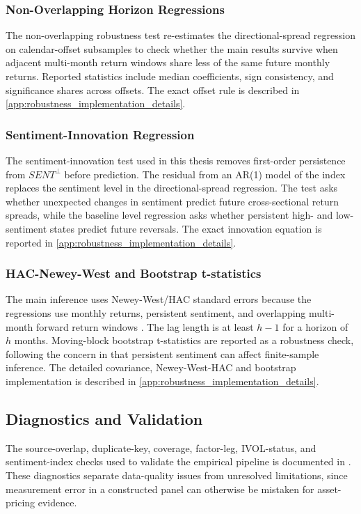 \documentclass[11pt]{article}
\newcommand{\var}[1]{\ensuremath{#1}}
\begin{document}
\subsubsection{Non-Overlapping Horizon Regressions}
The non-overlapping robustness test re-estimates the directional-spread regression on calendar-offset subsamples to check whether the main results survive when adjacent multi-month return windows share less of the same future monthly returns. Reported statistics include median coefficients, sign consistency, and significance shares across offsets. The exact offset rule is described in \cref{app:robustness_implementation_details}.

\subsubsection{Sentiment-Innovation Regression}
The sentiment-innovation test used in this thesis removes first-order persistence from \var{SENT^{\perp}} before prediction. The residual from an AR(1) model of the index replaces the sentiment level in the directional-spread regression. The test asks whether unexpected changes in sentiment predict future cross-sectional return spreads, while the baseline level regression asks whether persistent high- and low-sentiment states predict future reversals. The exact innovation equation is reported in \cref{app:robustness_implementation_details}.

\subsubsection{HAC-Newey-West and Bootstrap t-statistics}
The main inference uses Newey-West/HAC standard errors because the regressions use monthly returns, persistent sentiment, and overlapping multi-month forward return windows \citep{newey1987simple}. The lag length is at least \var{h-1} for a horizon of \var{h} months. Moving-block bootstrap t-statistics are reported as a robustness check, following the concern in \citet{baker2006sentiment} that persistent sentiment can affect finite-sample inference. The detailed covariance, Newey-West-HAC and bootstrap implementation is described in \cref{app:robustness_implementation_details}.

\subsection{Diagnostics and Validation}
The source-overlap, duplicate-key, coverage, factor-leg, IVOL-status, and sentiment-index checks used to validate the empirical pipeline is documented in . These diagnostics separate data-quality issues from unresolved limitations, since measurement error in a constructed panel can otherwise be mistaken for asset-pricing evidence.
\end{document}
